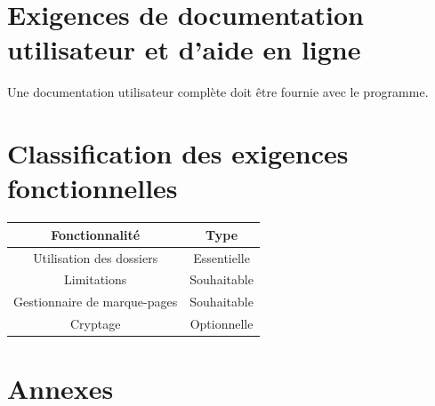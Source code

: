 \documentclass[10pt,a4paper]{report}
\begin{document}
\section{Exigences de documentation utilisateur et d’aide en ligne}
Une documentation utilisateur complète doit être fournie avec le programme.


\section{Classification des exigences fonctionnelles}
\bgroup
\def\arraystretch{1.5}
\begin{tabular}{|c|c|}
	\hline
	{\large \textbf{Fonctionnalité}} & {\large \textbf{Type}}\\
	\hline
	Utilisation des dossiers & Essentielle\\
	\hline
	Limitations & Souhaitable\\
	\hline
	Gestionnaire de marque-pages & Souhaitable\\
	\hline
	Cryptage & Optionnelle\\
	\hline
\end{tabular}
\egroup


\section{Annexes}
\end{document}
